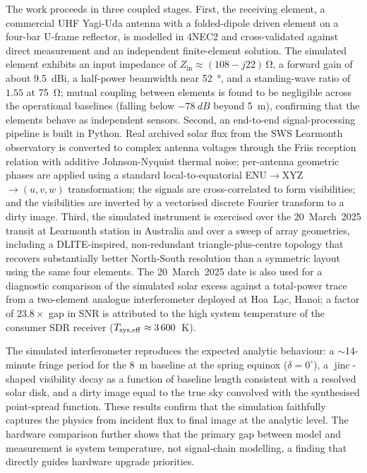 \documentclass[12pt,a4paper,oneside]{report}
\newcommand{\uvw}{(u,v,w)}
\DeclareMathOperator{\jinc}{jinc}
\begin{document}
The work proceeds in three coupled stages. First, the receiving element, a
commercial UHF Yagi-Uda antenna with a folded-dipole driven element on a
four-bar U-frame reflector, is modelled in 4NEC2 and cross-validated against direct
measurement and an independent finite-element solution. The simulated element exhibits an input impedance of
$Z_\mathrm{in}\approx (108 - j22)\,\si{\ohm}$, a forward gain of about \SI{9.5}{dBi}, a
half-power beamwidth near \SI{52}{\degree}, and a standing-wave ratio of $1.55$ at
\SI{75}{\ohm}; mutual coupling between elements is found to be negligible across the
operational baselines (falling below $-78~\si{dB}$ beyond \SI{5}{\metre}), confirming
that the elements behave as independent sensors. Second, an end-to-end signal-processing pipeline is built in
Python. Real archived solar flux from the SWS Learmonth observatory is converted to
complex antenna voltages through the Friis reception relation with additive
Johnson-Nyquist thermal noise; per-antenna geometric phases are applied using a
standard local-to-equatorial ENU$\rightarrow$XYZ$\rightarrow\uvw$ transformation;
the signals are cross-correlated to form visibilities; and the visibilities are
inverted by a vectorised discrete Fourier transform to a dirty image. Third, the simulated instrument is
exercised over the 20~March~2025 transit at Learmonth station in Australia and over a sweep of
array geometries, including a DLITE-inspired, non-redundant triangle-plus-centre
topology that recovers substantially better North-South resolution than a symmetric
layout using the same four elements. The 20~March~2025 date is also used for a
diagnostic comparison of the simulated solar excess
against a total-power trace from a two-element analogue interferometer deployed
at Hoa~L\d{a}c, Hanoi; a factor of $23.8\times$ gap in SNR is attributed to the
high system temperature of the consumer SDR receiver ($T_{\rm sys,eff}\approx3\,600$~K).

The simulated interferometer reproduces the expected analytic behaviour: a
\mbox{$\sim$14-minute} fringe period for the \SI{8}{\metre} baseline at the spring equinox
($\delta=0^\circ$), a
$\jinc$-shaped visibility decay as a function of baseline length consistent with a
resolved solar disk, and a dirty image equal to the true sky convolved with the
synthesised point-spread function. These results confirm that the simulation faithfully captures the physics from
incident flux to final image at the analytic level.  The hardware comparison further
shows that the primary gap between model and measurement is system temperature, not
signal-chain modelling, a finding that directly guides hardware upgrade priorities.
\end{document}
